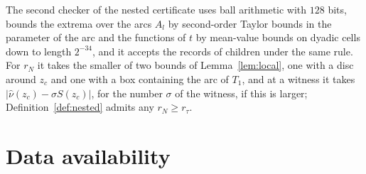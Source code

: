 \documentclass[11pt]{amsart}
\theoremstyle{definition}
\theoremstyle{remark}
\numberwithin{equation}{section}
\begin{document}
The second checker of the nested certificate uses ball arithmetic with $128$ bits, bounds the extrema over the arcs $A_l$ by second-order Taylor bounds in the parameter of the arc and the functions of $t$ by mean-value bounds on dyadic cells down to length $2^{-34}$, and it accepts the records of children under the same rule. For $r_N$ it takes the smaller of two bounds of Lemma~\ref{lem:local}, one with a disc around $z_c$ and one with a box containing the arc of $T_1$, and at a witness it takes $|\hat\nu(z_c)-\sigma S(z_c)|$, for the number $\sigma$ of the witness, if this is larger; Definition~\ref{def:nested} admits any $r_N\ge r_\tau$.

\section*{Data availability}
\end{document}
